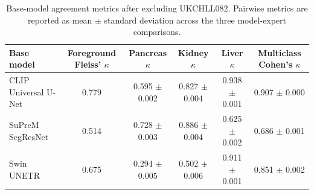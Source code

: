 \begin{table}[h]
\centering
\small
\begin{tabular}{lccccc}
\toprule
\textbf{Base model}
& \textbf{Foreground Fleiss' $\kappa$}
& \textbf{Pancreas $\kappa$}
& \textbf{Kidney $\kappa$}
& \textbf{Liver $\kappa$}
& \textbf{Multiclass Cohen's $\kappa$} \\
\midrule
CLIP Universal U-Net & 0.779 & 0.595 $\pm$ 0.002 & 0.827 $\pm$ 0.004 & 0.938 $\pm$ 0.001 & 0.907 $\pm$ 0.000 \\
SuPreM SegResNet & 0.514 & 0.728 $\pm$ 0.003 & 0.886 $\pm$ 0.004 & 0.625 $\pm$ 0.002 & 0.686 $\pm$ 0.001 \\
Swin UNETR & 0.675 & 0.294 $\pm$ 0.005 & 0.502 $\pm$ 0.006 & 0.911 $\pm$ 0.001 & 0.851 $\pm$ 0.002 \\
\bottomrule
\end{tabular}
\caption{Base-model agreement metrics after excluding UKCHLL082. Pairwise metrics are reported as mean $\pm$ standard deviation across the three model-expert comparisons.}
\label{tab:base_model_kappa_comparison_excluding_invalid_case}
\end{table}
